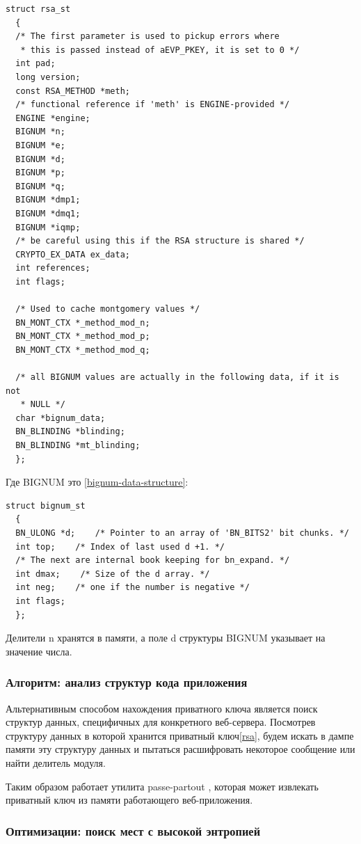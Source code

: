 \documentclass[20pt]{article}
\begin{document}
\begin{lstlisting}[caption={Структура приватного ключа RSA},label={rsa-data-structure}]
struct rsa_st
  {
  /* The first parameter is used to pickup errors where
   * this is passed instead of aEVP_PKEY, it is set to 0 */
  int pad;
  long version;
  const RSA_METHOD *meth;
  /* functional reference if 'meth' is ENGINE-provided */
  ENGINE *engine;
  BIGNUM *n;
  BIGNUM *e;
  BIGNUM *d;
  BIGNUM *p;
  BIGNUM *q;
  BIGNUM *dmp1;
  BIGNUM *dmq1;
  BIGNUM *iqmp;
  /* be careful using this if the RSA structure is shared */
  CRYPTO_EX_DATA ex_data;
  int references;
  int flags;

  /* Used to cache montgomery values */
  BN_MONT_CTX *_method_mod_n;
  BN_MONT_CTX *_method_mod_p;
  BN_MONT_CTX *_method_mod_q;

  /* all BIGNUM values are actually in the following data, if it is not
   * NULL */
  char *bignum_data;
  BN_BLINDING *blinding;
  BN_BLINDING *mt_blinding;
  };
\end{lstlisting}

Где BIGNUM это \ref{bignum-data-structure}:
\begin{lstlisting}[caption={Структура BIGNUM},label={bignum-data-structure}]
  struct bignum_st
  {
  BN_ULONG *d;    /* Pointer to an array of 'BN_BITS2' bit chunks. */
  int top;    /* Index of last used d +1. */
  /* The next are internal book keeping for bn_expand. */
  int dmax;    /* Size of the d array. */
  int neg;    /* one if the number is negative */
  int flags;
  };
\end{lstlisting}

Делители n хранятся в памяти, а поле d структуры BIGNUM указывает на
значение числа.

\subsubsection{Алгоритм: анализ структур кода приложения}

Альтернативным способом нахождения приватного ключа является поиск структур
данных, специфичных для конкретного веб-сервера. Посмотрев структуру данных в которой
хранится приватный ключ\ref{rsa}, будем искать в дампе памяти эту структуру данных
и пытаться расшифровать некоторое сообщение или найти делитель модуля.

Таким образом работает утилита passe-partout \cite{passe-partout}, которая может
извлекать приватный ключ из памяти работающего веб-приложения.

\subsubsection{Оптимизации: поиск мест с высокой энтропией}
\end{document}
